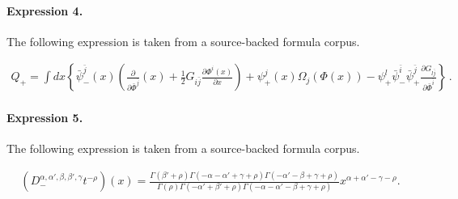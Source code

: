 \documentclass[11pt]{article}
\begin{document}
\paragraph{Expression 4.} The following expression is taken from a source-backed formula corpus.

\begin{align*} Q_{+}= \int dx \left\{ \bar{\psi}_{-}^{\bar{j}}(x) \left( \frac{\partial}{\partial \bar{\Phi}^{\bar{j}}}(x)+\frac{1}{2} G_{i\bar{j}}\frac{\partial \Phi^{i}(x)}{\partial x}\right) +\psi_{+}^{j}(x) \Omega_j(\Phi(x)) -\psi^{l}_{+}\bar{\psi}^{\bar{i}}_{-}\bar{\psi}^{\bar{j}}_{+}\frac{\partial G_{l\bar{j}}}{\partial \bar{\Phi}^{\bar{i}}}\right\}\,.\end{align*}

\paragraph{Expression 5.} The following expression is taken from a source-backed formula corpus.

\begin{align*}\left(D_{-}^{\alpha,\alpha',\beta,\beta',\gamma}t^{-\rho}\right)(x)=\frac{\Gamma\left(\beta'+\rho\right)\Gamma\left(-\alpha-\alpha'+\gamma+\rho\right)\Gamma\left(-\alpha'-\beta+\gamma+\rho\right)}{\Gamma\left(\rho\right)\Gamma\left(-\alpha'+\beta'+\rho\right)\Gamma\left(-\alpha-\alpha'-\beta+\gamma+\rho\right)}x^{\alpha+\alpha'-\gamma-\rho}.\end{align*}
\end{document}
